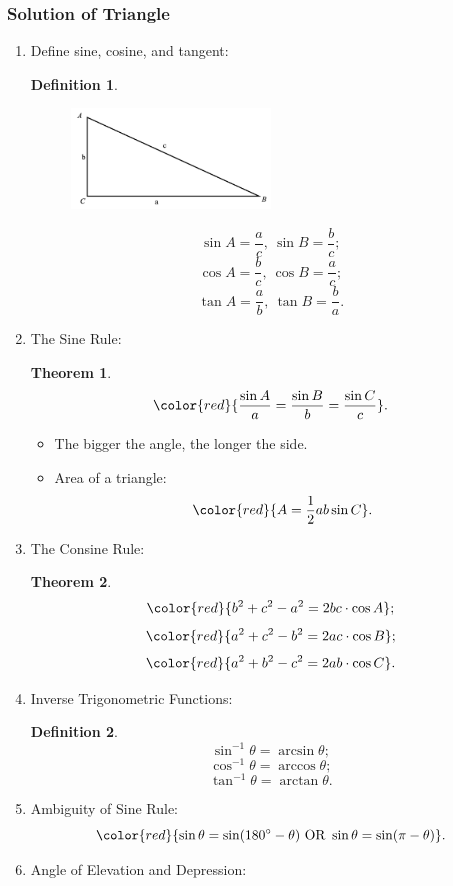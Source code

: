 \documentclass[12pt, a4paper]{article}
\newtheorem{theorem}{Theorem}[subsection]
\newtheorem{definition}{Definition}[subsection]
\begin{document}
\subsubsection{Solution of Triangle}
\begin{enumerate}
  \item Define sine, cosine, and tangent: 
  \begin{definition}
    \begin{figure}[H]
      \centering
      \includegraphics[width=0.5\textwidth]{Fig.3.19.jpg}
    \end{figure}
    $$\sin A=\frac{a}{c},\ \sin B=\frac{b}{c};$$
    $$\cos A=\frac{b}{c},\ \cos B=\frac{a}{c};$$
    $$\tan A=\frac{a}{b},\ \tan B=\frac{b}{a}.$$
  \end{definition}
  \item The Sine Rule: 
  \begin{theorem}
    $${\color{red}{\frac{\sin A}{a}=\frac{\sin B}{b}=\frac{\sin C}{c}}}.$$
  \end{theorem}
  \begin{itemize}
    \item The bigger the angle, the longer the side. 
    \item Area of a triangle: $${\color{red}{A=\frac{1}{2}ab\sin C}}.$$
  \end{itemize}
  \item The Consine Rule: 
  \begin{theorem}
    $${\color{red}{b^2+c^2-a^2=2bc\cdot\cos A}};$$
    $${\color{red}{a^2+c^2-b^2=2ac\cdot\cos B}};$$
    $${\color{red}{a^2+b^2-c^2=2ab\cdot\cos C}}.$$
  \end{theorem}
  \item Inverse Trigonometric Functions: 
  \begin{definition}
    $$\sin^{-1}\theta=\arcsin\theta;$$
    $$\cos^{-1}\theta=\arccos\theta;$$
    $$\tan^{-1}\theta=\arctan\theta.$$
  \end{definition}
  \item Ambiguity of Sine Rule: 
  $${\color{red}{\sin\theta=\sin(180^\circ-\theta)\text{ OR }\sin\theta=\sin(\pi-\theta)}}.$$
  \item Angle of Elevation and Depression: 

\end{enumerate}
\end{document}
